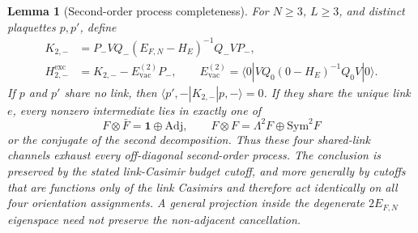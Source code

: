 \documentclass[11pt]{article}
\theoremstyle{plain}
\newtheorem{lemma}[theorem]{Lemma}
\theoremstyle{definition}
\theoremstyle{remark}
\begin{document}
\begin{lemma}[Second-order process completeness]\label{lem:process-complete}
For $N\ge3$, $L\ge3$, and distinct plaquettes $p,p'$, define
\begin{align}
 K_{2,-}&=P_-VQ_-(E_{F,N}-H_E)^{-1}Q_-VP_-,
   \label{eq:K2raw}\\
 H^{\mathrm{exc}}_{2,-}
 &=K_{2,-}-E^{(2)}_{\mathrm{vac}}P_-,
 \qquad
 E^{(2)}_{\mathrm{vac}}
 =\langle0|VQ_0(0-H_E)^{-1}Q_0V|0\rangle .
 \label{eq:K2exc}
\end{align}
If $p$ and $p'$ share no link, then
$\langle p',-|K_{2,-}|p,-\rangle=0$. If they share the unique link $e$,
every nonzero intermediate lies in exactly one of
\[
 F\otimes\bar F=\mathbf1\oplus\mathrm{Adj},\qquad
 F\otimes F=\Lambda^2F\oplus\mathrm{Sym}^2F
\]
or the conjugate of the second decomposition. Thus these four shared-link
channels exhaust every off-diagonal second-order process. The conclusion is
preserved by the stated link-Casimir budget cutoff, and more generally by
cutoffs that are functions only of the link Casimirs and therefore act
identically on all four orientation assignments. A general projection inside
the degenerate $2E_{F,N}$ eigenspace need not preserve the non-adjacent
cancellation.
\end{lemma}
\end{document}
